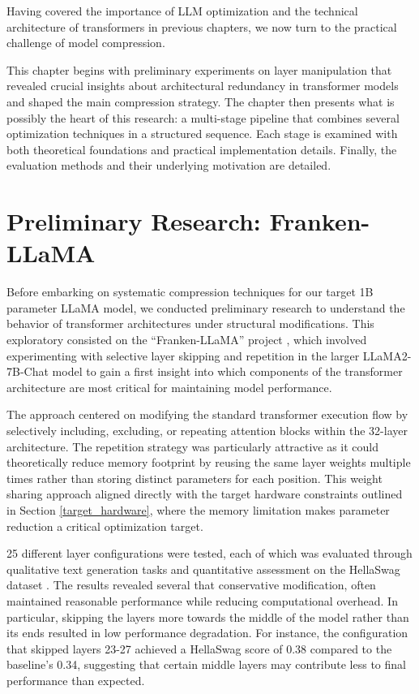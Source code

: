 Having covered the importance of LLM optimization and the technical architecture of transformers in previous chapters, we now turn to the practical challenge of model compression.

This chapter begins with preliminary experiments on layer manipulation that revealed crucial insights about architectural redundancy in transformer models and shaped the main compression strategy. The chapter then presents what is possibly the heart of this research: a multi-stage pipeline that combines several optimization techniques in a structured sequence. Each stage is examined with both theoretical foundations and practical implementation details. Finally, the evaluation methods and their underlying motivation are detailed.

\section{Preliminary Research: Franken-LLaMA} \label{frankenllama}

Before embarking on systematic compression techniques for our target 1B parameter LLaMA model, we conducted preliminary research to understand the behavior of transformer architectures under structural modifications. This exploratory consisted on the ``Franken-LLaMA'' project \cite{franken-llama}, which involved experimenting with selective layer skipping and repetition in the larger LLaMA2-7B-Chat \cite{llama2} model to gain a first insight into which components of the transformer architecture are most critical for maintaining model performance.

The approach centered on modifying the standard transformer execution flow by selectively including, excluding, or repeating attention blocks within the 32-layer architecture. The repetition strategy was particularly attractive as it could theoretically reduce memory footprint by reusing the same layer weights multiple times rather than storing distinct parameters for each position. This weight sharing approach aligned directly with the target hardware constraints outlined in Section \ref{target_hardware}, where the memory limitation makes parameter reduction a critical optimization target.

25 different layer configurations were tested, each of which was evaluated through qualitative text generation tasks and quantitative assessment on the HellaSwag dataset \cite{hellaswag}.
The results revealed several that conservative modification, often maintained reasonable performance while reducing computational overhead. In particular, skipping the layers more towards the middle of the model rather than its ends resulted in low performance degradation. For instance, the configuration that skipped layers 23-27 achieved a HellaSwag score of 0.38 compared to the baseline's 0.34, suggesting that certain middle layers may contribute less to final performance than expected.

